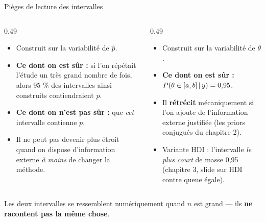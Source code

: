\begin{frame}{Pièges de lecture des intervalles}
\begin{columns}[t]
\begin{column}{0.49\textwidth}
\begin{wbox}
\begin{itemize}
  \item Construit sur la variabilité de $\hat p$.
  \item \textbf{Ce dont on est sûr :} si l'on répétait l'étude un très grand nombre de fois,
        alors 95 \% des intervalles ainsi construits contiendraient $p$.
  \item \textbf{Ce dont on n'est pas sûr :} que \emph{cet} intervalle contienne $p$.
  \item Il ne peut pas devenir plus étroit quand on dispose d'information externe
        \emph{à moins} de changer la méthode.
\end{itemize}
\end{wbox}
\end{column}
\begin{column}{0.49\textwidth}
\begin{solbox}
\begin{itemize}
  \item Construit sur la variabilité de $\theta$.
  \item \textbf{Ce dont on est sûr :} $P(\theta \in [a,b] \,\vert\, y) = 0{,}95$.
  \item Il \textbf{rétrécit} mécaniquement si l'on ajoute de l'information externe
        justifiée (les priors conjugués du chapitre 2).
  \item Variante HDI : l'intervalle \emph{le plus court} de masse 0,95
        (chapitre 3, slide sur HDI contre queue égale).
\end{itemize}
\end{solbox}
\end{column}
\end{columns}
\vspace{1mm}
\centering\small
Les deux intervalles se ressemblent numériquement quand $n$ est grand —
ils \textbf{ne racontent pas la même chose}.
\end{frame}
